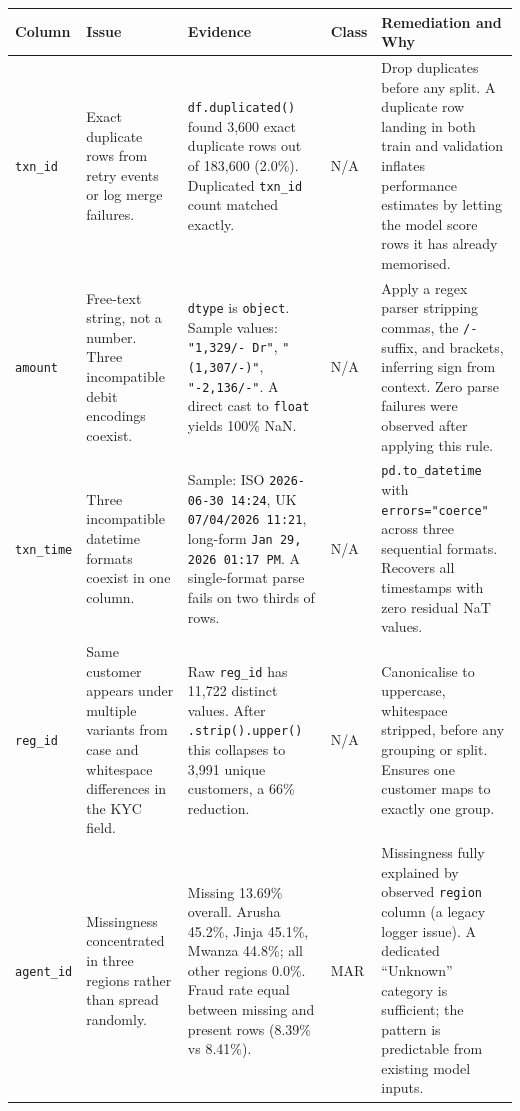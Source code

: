 \documentclass[11pt,a4paper]{article}
\begin{document}
\vspace{2pt}
\begin{center}
\scriptsize
\setlength{\tabcolsep}{3pt}
\renewcommand{\arraystretch}{1.15}
\begin{tabularx}{\textwidth}{@{}P{1.8cm} P{2.3cm} P{3.0cm} P{1.2cm} P{4.5cm}@{}}
\toprule
\textbf{Column} & \textbf{Issue} & \textbf{Evidence} & \textbf{Class} & \textbf{Remediation and Why} \\
\midrule

\texttt{txn\_id} &
Exact duplicate rows from retry events or log merge failures. &
\texttt{df.duplicated()} found 3,600 exact duplicate rows out of 183,600 (2.0\%). Duplicated \texttt{txn\_id} count matched exactly. &
N/A &
Drop duplicates before any split. A duplicate row landing in both train and validation inflates performance estimates by letting the model score rows it has already memorised. \\

\texttt{amount} &
Free-text string, not a number. Three incompatible debit encodings coexist. &
\texttt{dtype} is \texttt{object}. Sample values: \texttt{"1,329/- Dr"}, \texttt{"(1,307/-)"}, \texttt{"-2,136/-"}. A direct cast to \texttt{float} yields 100\% NaN. &
N/A &
Apply a regex parser stripping commas, the \texttt{/-} suffix, and brackets, inferring sign from context. Zero parse failures were observed after applying this rule. \\

\texttt{txn\_time} &
Three incompatible datetime formats coexist in one column. &
Sample: ISO \texttt{2026-06-30 14:24}, UK \texttt{07/04/2026 11:21}, long-form \texttt{Jan 29, 2026 01:17 PM}. A single-format parse fails on two thirds of rows. &
N/A &
\texttt{pd.to\_datetime} with \texttt{errors="coerce"} across three sequential formats. Recovers all timestamps with zero residual NaT values. \\

\texttt{reg\_id} &
Same customer appears under multiple variants from case and whitespace differences in the KYC field. &
Raw \texttt{reg\_id} has 11,722 distinct values. After \texttt{.strip().upper()} this collapses to 3,991 unique customers, a 66\% reduction. &
N/A &
Canonicalise to uppercase, whitespace stripped, before any grouping or split. Ensures one customer maps to exactly one group. \\

\texttt{agent\_id} &
Missingness concentrated in three regions rather than spread randomly. &
Missing 13.69\% overall. Arusha 45.2\%, Jinja 45.1\%, Mwanza 44.8\%; all other regions 0.0\%. Fraud rate equal between missing and present rows (8.39\% vs 8.41\%). &
MAR &
Missingness fully explained by observed \texttt{region} column (a legacy logger issue). A dedicated ``Unknown'' category is sufficient; the pattern is predictable from existing model inputs. \\


\end{tabularx}
\end{center}
\end{document}
